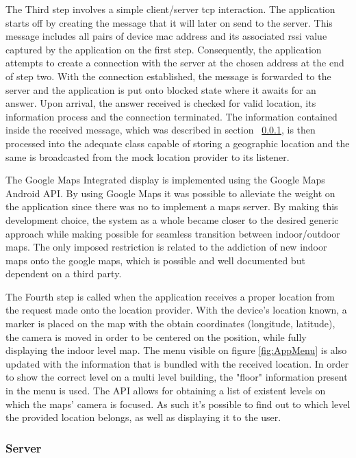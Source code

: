 \documentclass[a4paper]{IEEEtran}
\begin{document}
 
The Third step involves a simple client/server tcp interaction. The application starts off by creating the message that it will later on send to the server. This message includes all pairs of device mac address and its associated rssi value captured by the application on the first step. Consequently, the application attempts to create a connection with the server at the chosen address at the end of step two. With the connection established, the message is forwarded to the server and the application is put onto blocked state where it awaits for an answer. Upon arrival, the answer received is checked for valid location, its information process and the connection terminated. The information contained inside the received message, which was described in section ~\ref{subsec:server}, is then processed into the adequate class capable of storing a geographic location and the same is broadcasted from the mock location provider to its listener.  
 
 
 
 
The Google Maps Integrated display is implemented using the Google Maps Android API. By using Google Maps it was possible to alleviate the weight on the application since there was no to implement a maps server.  By making this development choice, the system as a whole became closer to the desired generic approach while making possible for seamless transition between indoor/outdoor maps. The only imposed restriction is related to the addiction of new indoor maps onto the google maps, which is possible and well documented but dependent on a third party. 
 
 
The Fourth step is called when the application receives a proper location from the request made onto the location provider. With the device's location known, a marker is placed on the map with the obtain coordinates (longitude, latitude), the camera is moved in order to be centered on the position, while fully displaying the indoor level map. The menu visible on figure \ref{fig:AppMenu} is also updated with the information that is bundled with the received location. In order to show the correct level on a multi level building, the "floor" information present in the menu is used. The API allows for obtaining a list of existent levels on which the maps' camera is focused. As such it's possible to find out to which level the provided location belongs, as well as displaying it to the user. 
 
 
 
 
\subsubsection{ Server} 
\label{subsec:server} 
 
\end{document}

